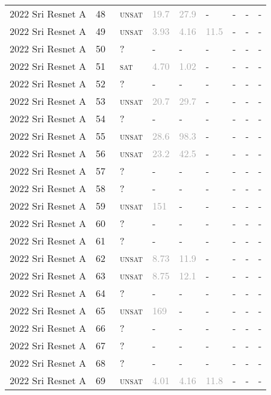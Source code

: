 \begin{center}
{\begin{longtable}{@{}lllllllll@{}}
2022 Sri Resnet A & 48 & ~\textsc{unsat} & \textcolor{darkgray}{19.7} & \textcolor{darkgray}{27.9} & - & - & - & - \\
2022 Sri Resnet A & 49 & ~\textsc{unsat} & \textcolor{darkgray}{3.93} & \textcolor{darkgray}{4.16} & \textcolor{darkgray}{11.5} & - & - & - \\
2022 Sri Resnet A & 50 & ~? & - & - & - & - & - & - \\
2022 Sri Resnet A & 51 & ~\textsc{sat} & \textcolor{darkgray}{4.70} & \textcolor{darkgray}{1.02} & - & - & - & - \\
2022 Sri Resnet A & 52 & ~? & - & - & - & - & - & - \\
2022 Sri Resnet A & 53 & ~\textsc{unsat} & \textcolor{darkgray}{20.7} & \textcolor{darkgray}{29.7} & - & - & - & - \\
2022 Sri Resnet A & 54 & ~? & - & - & - & - & - & - \\
2022 Sri Resnet A & 55 & ~\textsc{unsat} & \textcolor{darkgray}{28.6} & \textcolor{darkgray}{98.3} & - & - & - & - \\
2022 Sri Resnet A & 56 & ~\textsc{unsat} & \textcolor{darkgray}{23.2} & \textcolor{darkgray}{42.5} & - & - & - & - \\
2022 Sri Resnet A & 57 & ~? & - & - & - & - & - & - \\
2022 Sri Resnet A & 58 & ~? & - & - & - & - & - & - \\
2022 Sri Resnet A & 59 & ~\textsc{unsat} & \textcolor{darkgray}{151} & - & - & - & - & - \\
2022 Sri Resnet A & 60 & ~? & - & - & - & - & - & - \\
2022 Sri Resnet A & 61 & ~? & - & - & - & - & - & - \\
2022 Sri Resnet A & 62 & ~\textsc{unsat} & \textcolor{darkgray}{8.73} & \textcolor{darkgray}{11.9} & - & - & - & - \\
2022 Sri Resnet A & 63 & ~\textsc{unsat} & \textcolor{darkgray}{8.75} & \textcolor{darkgray}{12.1} & - & - & - & - \\
2022 Sri Resnet A & 64 & ~? & - & - & - & - & - & - \\
2022 Sri Resnet A & 65 & ~\textsc{unsat} & \textcolor{darkgray}{169} & - & - & - & - & - \\
2022 Sri Resnet A & 66 & ~? & - & - & - & - & - & - \\
2022 Sri Resnet A & 67 & ~? & - & - & - & - & - & - \\
2022 Sri Resnet A & 68 & ~? & - & - & - & - & - & - \\
2022 Sri Resnet A & 69 & ~\textsc{unsat} & \textcolor{darkgray}{4.01} & \textcolor{darkgray}{4.16} & \textcolor{darkgray}{11.8} & - & - & - \\

\end{longtable}}
\end{center}
